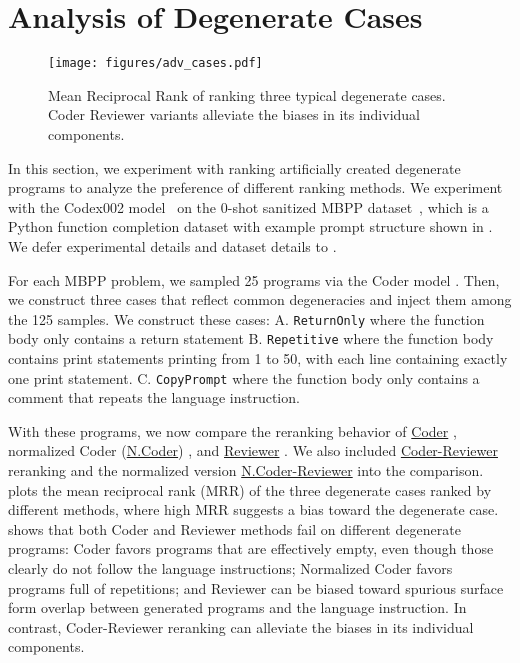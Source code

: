\documentclass[nohyperref]{article}
\theoremstyle{plain}
\theoremstyle{definition}
\theoremstyle{remark}
\begin{document}
 \section{Analysis of Degenerate Cases}
\label{sec:analysis}



\begin{figure}[]
     \centering
     \texttt{[image: figures/adv\_cases.pdf]}
     \caption{Mean Reciprocal Rank of ranking three typical degenerate cases. Coder Reviewer variants alleviate the biases in its individual components.}
     \label{fig:adv_cases}
     \vspace{-10pt}
\end{figure}
In this section, we experiment with ranking artificially created degenerate programs to analyze the preference of different ranking methods.
We experiment with the Codex002 model~\citep{codex} on the 0-shot sanitized MBPP dataset~\citep[MBPP-S][]{mbpp}, which is a Python function completion dataset with example prompt structure shown in .
We defer experimental details and dataset details to .

For each MBPP problem, we sampled 25 programs via the Coder model .
Then, we construct three cases that reflect common degeneracies and inject them among the 125 samples.
We construct these cases:
A. \texttt{ReturnOnly} where the function body only contains a return statement 
B. \texttt{Repetitive} where the function body contains print statements printing from 1 to 50, with each line containing exactly one print statement.
C. \texttt{CopyPrompt} where the function body only contains a comment that repeats the language instruction.

With these programs, we now compare the reranking behavior of \underline{Coder} , normalized Coder (\underline{N.Coder}) , and \underline{Reviewer} .
We also included \underline{Coder-Reviewer} reranking and the normalized version \underline{N.Coder-Reviewer} into the comparison.
 plots the mean reciprocal rank (MRR) of the three degenerate cases ranked by different methods, where high MRR suggests a bias toward the degenerate case.
 shows that both Coder and Reviewer methods fail on different degenerate programs: Coder favors programs that are effectively empty, even though those clearly do not follow the language instructions; Normalized Coder favors programs full of repetitions; and Reviewer can be biased toward spurious surface form overlap between generated programs and the language instruction.
In contrast, Coder-Reviewer reranking can alleviate the biases in its individual components.
\end{document}
